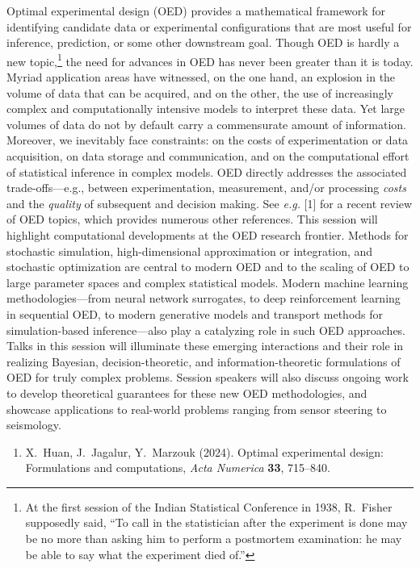 \documentclass[12pt,lettersize,oneside]{book} %
\begin{document}
\begin{session}
 Optimal experimental design (OED) provides a mathematical framework for identifying candidate data or experimental configurations that are most useful for inference, prediction, or some other downstream goal. Though OED is hardly a new topic,\footnote{At the first session of the Indian Statistical Conference in 1938, R.\ Fisher supposedly said, ``To call in the statistician after the experiment is done may be no more than asking him to perform a postmortem examination: he may be able to say what the experiment died of.''} the need for advances in OED has never been greater than it is today. Myriad application areas have witnessed, on the one hand, an explosion in the volume of data that can be acquired, and on the other, the use of increasingly complex and computationally intensive models to interpret these data. Yet large volumes of data do not by default carry a commensurate amount of information. Moreover, we inevitably face constraints: on the costs of experimentation or data acquisition, on data storage and communication, and on the computational effort of statistical inference in complex models. OED directly addresses the associated trade-offs---e.g., between experimentation, measurement, and/or processing \textit{costs} and
 the \textit{quality} of subsequent and decision making. See {\it e.g.} [1] for a recent review of OED topics, which provides numerous other references.
 This session will highlight computational developments at the OED research frontier. Methods for stochastic simulation, high-dimensional approximation or integration, and stochastic optimization are central to modern OED and to the scaling of OED to large parameter spaces and complex statistical models. Modern machine learning methodologies---from neural network surrogates, to deep reinforcement learning in sequential OED, to modern generative models and transport methods for simulation-based inference---also play a catalyzing role in such OED approaches. Talks in this session will illuminate these emerging interactions and their role in realizing Bayesian, decision-theoretic, and information-theoretic formulations of OED for truly complex problems. Session speakers will also discuss ongoing work to develop theoretical guarantees for these new OED methodologies, and showcase applications to real-world problems ranging from sensor steering to seismology.
 \medskip
 \begin{enumerate}
 \item[{[1]}] X.\ Huan, J.\ Jagalur, Y.\ Marzouk (2024). Optimal experimental design: Formulations and computations, \textit{Acta Numerica} \textbf{33}, 715--840.
 \end{enumerate}
\end{session}
\end{document}
